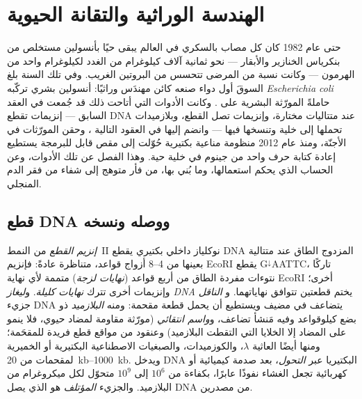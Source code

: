 \chapter{الهندسة الوراثية والتقانة الحيوية}\label{ch:b3:genetic-engineering}

حتى عام 1982 كان كل مصاب بالسكري في العالم يبقى حيًا بأنسولين
مستخلص من بنكرياس الخنازير والأبقار --- نحو ثمانية آلاف كيلوغرام من
الغدد لكيلوغرام واحد من الهرمون --- وكانت نسبة من المرضى تتحسس من
البروتين الغريب. وفي تلك السنة بلغ السوقَ أول دواء صنعه كائن
مهندَس وراثيًا: أنسولين بشري تركّبه \emph{Escherichia coli} حاملةً
المورّثة البشرية على . وكانت الأدوات التي أتاحت ذلك قد
جُمعت في العقد السابق --- إنزيمات تقطع DNA عند متتاليات
مختارة، وإنزيمات تصل القطع، وبلازميدات تحملها إلى
خلية وتنسخها فيها --- وانضم إليها في العقود التالية
، وحقن المورّثات في الأجنّة،
ومنذ عام 2012 منظومة مناعية بكتيرية حُوّلت إلى مقص
قابل للبرمجة يستطيع إعادة كتابة حرف واحد من جينوم
في خلية حية. وهذا الفصل عن تلك الأدوات، وعن الحساب
الذي يحكم استعمالها، وما بُني بها، من فأر
متوهج إلى شفاء من فقر الدم المنجلي.

\section{قطع DNA ووصله ونسخه}

\begin{definition}\label{def:b3:genetic-engineering:tools}
\emph{إنزيم القطع} من النمط~II نوكلياز داخلي بكتيري
يقطع DNA المزدوج الطاق عند متتالية بعينها من \numrange{4}{8}
أزواج قواعد، متناظرة عادةً: فإنزيم EcoRI يقطع G$^{\downarrow}$AATTC،
تاركًا نتوءات مفردة الطاق من أربع قواعد (\emph{نهايات لزجة})
متممة لأي نهاية EcoRI أخرى؛ وإنزيمات أخرى تترك \emph{نهايات
كليلة}. و\emph{ليغاز DNA} يختم قطعتين تتوافق نهاياتهما. و
\emph{الناقل} جزيء DNA يتضاعف في مضيف ويستطيع أن يحمل
قطعة مقحمة: ومنه \emph{البلازميد} ذو بضع كيلوقواعد وفيه
مَنشأ تضاعف، و\emph{واسم انتقائي} (مورّثة مقاومة
لمضاد حيوي، فلا ينمو على المضاد إلا الخلايا التي التقطت
البلازميد) وعنقود من مواقع قطع فريدة
للمقحَمة؛ ومنها أيضًا العاثية $\lambda$، والكوزميدات، والصبغيات
الاصطناعية البكتيرية أو الخميرية لمقحمات من \qtyrange{20}{1000}{kb}. ويدخل DNA
البكتيريا عبر \emph{التحول}، بعد صدمة كيميائية أو
كهربائية تجعل الغشاء نفوذًا عابرًا، بكفاءة
من $10^{6}$ إلى $10^{9}$ متحوّل لكل ميكروغرام من
البلازميد. والجزيء \emph{المؤتلف} هو الذي يصل DNA من
مصدرين.
\end{definition}

